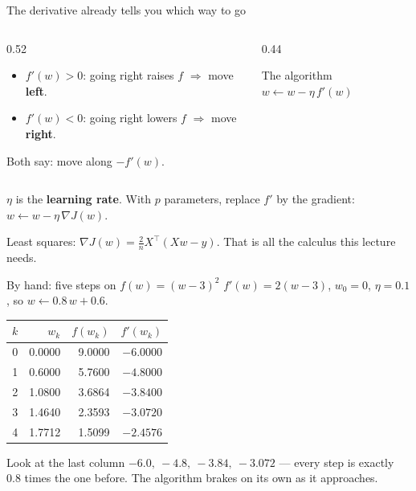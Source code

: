 \documentclass[aspectratio=169]{beamer}
\begin{document}
\begin{frame}{The derivative already tells you which way to go}
  \begin{columns}[T]
    \begin{column}{0.52\textwidth}
      \begin{itemize}
        \item $f'(w) > 0$: going right raises $f$ $\Rightarrow$ move
          \textbf{left}.
        \item $f'(w) < 0$: going right lowers $f$ $\Rightarrow$ move
          \textbf{right}.
      \end{itemize}
      \vspace{0.5em}
      Both say: move along $-f'(w)$.
    \end{column}
    \begin{column}{0.44\textwidth}
      \begin{exampleblock}{The algorithm}
        \centering\Large $w \leftarrow w - \eta\, f'(w)$
      \end{exampleblock}
    \end{column}
  \end{columns}
  \vspace{0.7em}
  \begin{center}
    $\eta$ is the \textbf{learning rate}. With $p$ parameters, replace $f'$ by
    the gradient: \quad $w \leftarrow w - \eta\,\nabla J(w)$.
  \end{center}
  \vspace{0.4em}
  \begin{center}\small
    Least squares: $\nabla J(w) = \frac{2}{n} X^\top (Xw - y)$. That is all the
    calculus this lecture needs.
  \end{center}
\end{frame}

\begin{frame}{By hand: five steps on $f(w)=(w-3)^2$}
  $f'(w) = 2(w-3)$, \quad $w_0 = 0$, \quad $\eta = 0.1$, \quad so
  $w \leftarrow 0.8\,w + 0.6$.
  \begin{center}\small
  \begin{tabular}{@{}rrrr@{}}
    \toprule
    $k$ & $w_k$ & $f(w_k)$ & $f'(w_k)$\\
    \midrule
    0 & 0.0000 & 9.0000 & $-6.0000$\\
    1 & 0.6000 & 5.7600 & $-4.8000$\\
    2 & 1.0800 & 3.6864 & $-3.8400$\\
    3 & 1.4640 & 2.3593 & $-3.0720$\\
    4 & 1.7712 & 1.5099 & $-2.4576$\\
    \bottomrule
  \end{tabular}
  \end{center}
  \vspace{0.2em}
  \begin{alertblock}{Look at the last column}
    \small $-6.0,\ -4.8,\ -3.84,\ -3.072$ --- every step is exactly $0.8$ times
    the one before. The algorithm brakes on its own as it approaches.
  \end{alertblock}
\end{frame}
\end{document}
